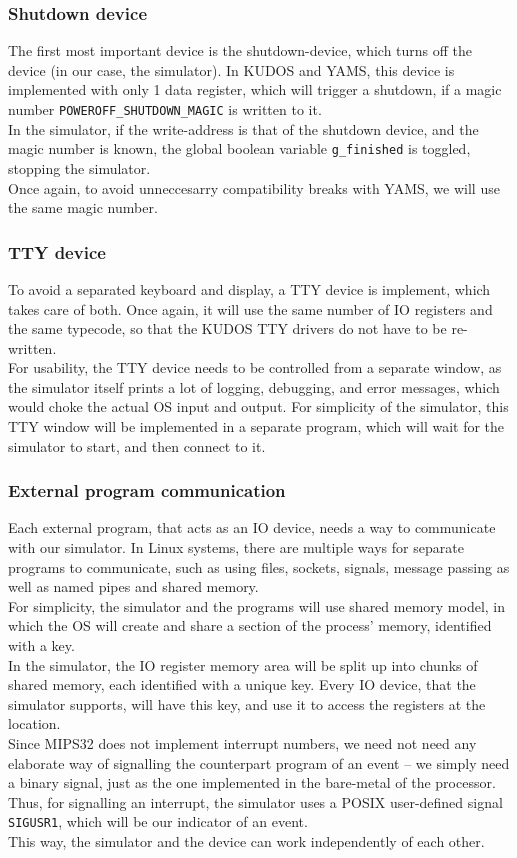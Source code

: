 \subsubsection{Shutdown device}
The first most important device is the shutdown-device, which turns off the
device (in our case, the simulator).
In KUDOS and YAMS, this device is implemented with only 1 data register, which
will trigger a shutdown, if a magic number \texttt{POWEROFF\_SHUTDOWN\_MAGIC} is
written to it\cite[drivers/metadev.h]{kudos}.\\
In the simulator, if the write-address is that of the shutdown device, and the
magic number is known, the global boolean variable \texttt{g\_finished} is
toggled, stopping the simulator.\\
Once again, to avoid unneccesarry compatibility breaks with YAMS, we will use
the same magic number.

\subsubsection{TTY device}
To avoid a separated keyboard and display, a TTY device is implement, which
takes care of both. Once again, it will use the same number of IO registers
and the same typecode, so that the KUDOS TTY drivers do not have to be
re-written.\\
For usability, the TTY device needs to be controlled from a separate window, as
the simulator itself prints a lot of logging, debugging, and error messages,
which would choke the actual OS input and output.
For simplicity of the simulator, this TTY window will be implemented in a
separate program, which will wait for the simulator to start, and then connect
to it.\\

\subsubsection{External program communication}
Each external program, that acts as an IO device, needs a way
to communicate with our simulator. In Linux systems, there are multiple ways for
separate programs to communicate, such as using files, sockets, signals,
message passing as well as named pipes and shared memory\cite{love2013linux}.\\
For simplicity, the simulator and the programs will use shared memory model,
in which the OS will create and share a section of the process' memory,
identified with a key.\\
In the simulator, the IO register memory area will be split up into chunks of
shared memory, each identified with a unique key. Every IO device, that the
simulator supports, will have this key, and use it to access the registers at
the location.\\
Since MIPS32 does not implement interrupt numbers, we need not need any elaborate
way of signalling the counterpart program of an event -- we simply need a binary
signal, just as the one implemented in the bare-metal of the processor. Thus,
for signalling an interrupt, the simulator uses a POSIX user-defined signal
\texttt{SIGUSR1}, which will be our indicator of an event.\\
This way, the simulator and the device can work independently of each other.
